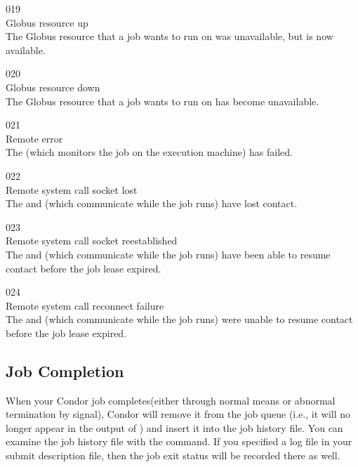 \noindent{} 019 \\
 Globus resource up \\
 The Globus resource that a job wants to run
on was unavailable, but is now available.

\noindent{} 020 \\
 Globus resource down \\
 The Globus resource that a job wants to run
on has become unavailable. 

\noindent{} 021 \\
 Remote error \\
 The  (which monitors the job
on the execution machine) has failed.

\noindent{} 022 \\
 Remote system call socket lost \\
 The  and 
(which communicate while the job runs) have lost contact.

\noindent{} 023 \\
 Remote system call socket reestablished \\
 The  and 
(which communicate while the job runs) have been able to resume
contact before the job lease expired.

\noindent{} 024 \\
 Remote system call reconnect failure \\
 The  and 
(which communicate while the job runs) were unable to resume
contact before the job lease expired.

\subsection{\label{sec:job-completion}Job Completion}

When your Condor job completes(either through normal means or abnormal
termination by signal), Condor will remove it from the job queue (i.e.,
it will no longer appear in the output of ) and insert it into
the job history file.  You can examine the job history file with the
 command. If you specified a log file in your submit
description file, then the job exit status will be recorded there as well.


